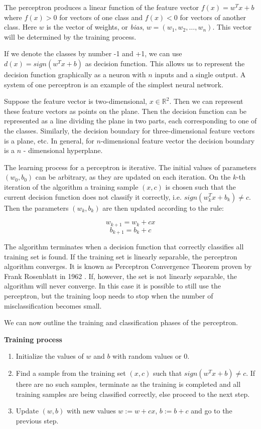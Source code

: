 \documentclass[12pt]{report}
\newcommand{\re}{\mathbb{R}}
\begin{document}
The perceptron produces a linear function of the feature vector $f(x) = w^Tx + b$ where $f(x) > 0$ for vectors of one class and $f(x) < 0$ for vectors of another class. Here $w$ is the vector of weights, or \textit{bias}, $w = (w_1, w_2, \dots, w_n)$. This vector will be determined by the training process.

If we denote the classes by number -1 and +1, we can use $d(x) = sign(w^Tx + b)$ as decision function. This allows us to represent the decision function graphically as a neuron with $n$ inputs and a single output. A system of one perceptron is an example of the simplest neural network.

Suppose the feature vector is two-dimensional, $x \in \re^2$. Then we can represent these feature vectors as points on the plane. Then the decision function can be represented as a line dividing the plane in two parts, each corresponding to one of the classes. Similarly, the decision boundary for three-dimensional feature vectors is a plane, etc. In general, for $n$-dimensional feature vector the decision boundary is a $n$ - dimensional hyperplane.

The learning process for a perceptron is iterative. The initial values of parameters $(w_0, b_0)$ can be arbitrary, as they are updated on each iteration. On the $k$-th iteration of the algorithm a training sample $(x, c)$ is chosen such that the current decision function does not classify it correctly, i.e. $sign(w_k^Tx + b_k) \ne c$. Then the parameters $(w_k, b_k)$ are then updated according to the rule:

$$w_{k+1} = w_k + cx$$
$$b_{k+1} = b_k + c$$

The algorithm terminates when a decision function that correctly classifies all training set is found. If the training set is linearly separable, the perceptron algorithm converges. It is known as Perceptron Convergence Theorem proven by Frank Rosenblatt in 1962 \cite{Cristianini}. If, however, the set is not linearly separable, the algorithm will never converge. In this case it is possible to still use the perceptron, but the training loop needs to stop when the number of misclassification becomes small.

We can now outline the training and classification phases of the perceptron.

\textbf{Training process}

\begin{enumerate}
	\item Initialize the values of $w$ and $b$ with random values or 0.
	\item Find a sample from the training set $(x, c)$ such that $sign(w^Tx + b) \ne c$. If there are no such samples, terminate as the training is completed and all training samples are being classified correctly, else proceed to the next step.
	\item Update $(w, b)$ with new values $w := w + cx$, $b := b + c$ and go to the previous step.
\end{enumerate}
\end{document}
